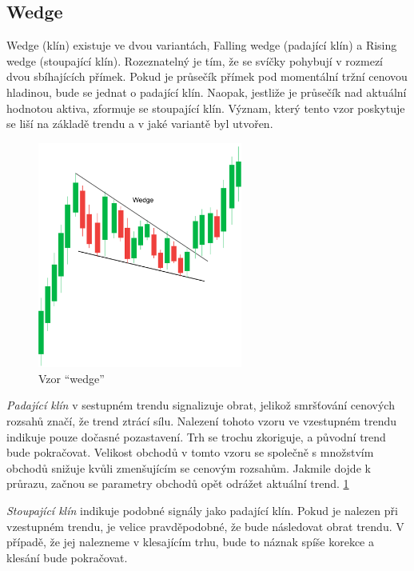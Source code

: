\subsection{Wedge}
Wedge (klín) existuje ve dvou variantách, Falling wedge (padající klín) a Rising wedge (stoupající klín). Rozeznatelný je tím, že se svíčky pohybují v rozmezí dvou sbíhajících přímek.
Pokud je průsečík přímek pod momentální tržní cenovou hladinou, bude se jednat o padající klín. Naopak, jestliže je průsečík nad aktuální hodnotou aktiva, zformuje se stoupající klín.
Význam, který tento vzor poskytuje se liší na základě trendu a v jaké variantě byl utvořen.
\begin{figure}[ht]
    \centering
    \includegraphics[width=0.6\textwidth]{Figures/wedge.pdf}
    \caption{Vzor \enquote{wedge}}
    \label{fig:wedge}
\end{figure}

\emph{Padající klín} v sestupném trendu signalizuje obrat, jelikož smršťování cenových rozsahů značí, že trend ztrácí sílu. Nalezení tohoto vzoru ve vzestupném trendu indikuje pouze
dočasné pozastavení. Trh se trochu zkoriguje, a původní trend bude pokračovat. Velikost obchodů v tomto vzoru se společně s množstvím obchodů snižuje kvůli zmenšujícím se cenovým
rozsahům. Jakmile dojde k průrazu, začnou se parametry obchodů opět odrážet aktuální trend. \ref{fig:wedge}

\emph{Stoupající klín} indikuje podobné signály jako padající klín. Pokud je nalezen při vzestupném trendu, je velice pravděpodobné, že bude následovat obrat trendu. V případě, že jej
nalezneme v klesajícím trhu, bude to náznak spíše korekce a klesání bude pokračovat.

